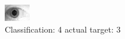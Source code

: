 \begin{figure}[h!]
\begin{center}
\includegraphics[width=0.60\columnwidth]{figures/ID1899_class_4_target_3.png}
\end{center}
\caption{ Classification: 4 actual target: 3}
\label{fig:ID1899_class_4_target_3}
\end{figure}
